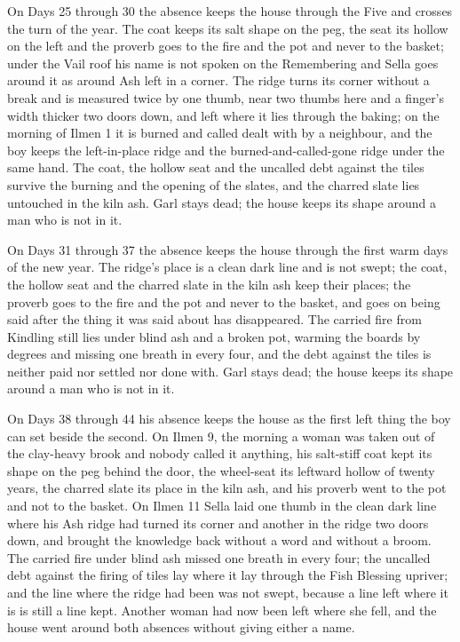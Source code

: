 \documentclass{design/chronicle}
\begin{document}
{On Days 25 through 30 the absence keeps the house through the Five and crosses the turn of the year. The coat keeps its salt shape on the peg, the seat its hollow on the left and the proverb goes to the fire and the pot and never to the basket; under the Vail roof his name is not spoken on the Remembering and Sella goes around it as around Ash left in a corner. The ridge turns its corner without a break and is measured twice by one thumb, near two thumbs here and a finger’s width thicker two doors down, and left where it lies through the baking; on the morning of Ilmen 1 it is burned and called dealt with by a neighbour, and the boy keeps the left-in-place ridge and the burned-and-called-gone ridge under the same hand. The coat, the hollow seat and the uncalled debt against the tiles survive the burning and the opening of the slates, and the charred slate lies untouched in the kiln ash. Garl stays dead; the house keeps its shape around a man who is not in it.

On Days 31 through 37 the absence keeps the house through the first warm days of the new year. The ridge’s place is a clean dark line and is not swept; the coat, the hollow seat and the charred slate in the kiln ash keep their places; the proverb goes to the fire and the pot and never to the basket, and goes on being said after the thing it was said about has disappeared. The carried fire from Kindling still lies under blind ash and a broken pot, warming the boards by degrees and missing one breath in every four, and the debt against the tiles is neither paid nor settled nor done with. Garl stays dead; the house keeps its shape around a man who is not in it.

On Days 38 through 44 his absence keeps the house as the first left thing the boy can set beside the second. On Ilmen 9, the morning a woman was taken out of the clay-heavy brook and nobody called it anything, his salt-stiff coat kept its shape on the peg behind the door, the wheel-seat its leftward hollow of twenty years, the charred slate its place in the kiln ash, and his proverb went to the pot and not to the basket. On Ilmen 11 Sella laid one thumb in the clean dark line where his Ash ridge had turned its corner and another in the ridge two doors down, and brought the knowledge back without a word and without a broom. The carried fire under blind ash missed one breath in every four; the uncalled debt against the firing of tiles lay where it lay through the Fish Blessing upriver; and the line where the ridge had been was not swept, because a line left where it is is still a line kept. Another woman had now been left where she fell, and the house went around both absences without giving either a name.

}
\end{document}

